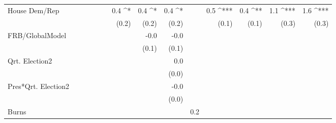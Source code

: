 \documentclass[a4paper]{article}\usepackage{graphicx, color}
\begin{document}
\begin{table}[ht]
\begin{center}
{\begin{tabular}{ l D{.}{.}{1}D{.}{.}{1}D{.}{.}{1}D{.}{.}{1}D{.}{.}{1}D{.}{.}{1}D{.}{.}{1}D{.}{.}{1}D{.}{.}{1}D{.}{.}{1}D{.}{.}{1}D{.}{.}{1}D{.}{.}{1} }
House Dem/Rep        &                 &                 &                 &                 &                 & 0.4 ^*          & 0.4 ^*          & 0.4 ^*          &                 & 0.5 ^{***}      & 0.4 ^{**}       & 1.1 ^{***}      & 1.6 ^{***}     \\ 
                     &                 &                 &                 &                 &                 & (0.2)           & (0.2)           & (0.2)           &                 & (0.1)           & (0.1)           & (0.3)           & (0.3)          \\ 
FRB/GlobalModel      &                 &                 &                 &                 &                 &                 & -0.0            & -0.0            &                 &                 &                 &                 &                \\ 
                     &                 &                 &                 &                 &                 &                 & (0.1)           & (0.1)           &                 &                 &                 &                 &                \\ 
Qrt. Election2       &                 &                 &                 &                 &                 &                 &                 & 0.0             &                 &                 &                 &                 &                \\ 
                     &                 &                 &                 &                 &                 &                 &                 & (0.0)           &                 &                 &                 &                 &                \\ 
Pres*Qrt. Election2  &                 &                 &                 &                 &                 &                 &                 & -0.0            &                 &                 &                 &                 &                \\ 
                     &                 &                 &                 &                 &                 &                 &                 & (0.0)           &                 &                 &                 &                 &                \\ 
Burns                &                 &                 &                 &                 &                 &                 &                 &                 & 0.2             &                 &                 &                 &                \\ 

\end{tabular}}
\end{center}
\end{table}
\end{document}
